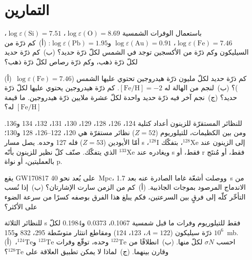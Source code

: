 \section{التمارين}

\begin{exercise}[$\star$]\label{exo:b3:origin-of-elements:1}
باستعمال الوفرات الشمسية $\log\varepsilon(\mathrm{O}) = 8.69$،
$\log\varepsilon(\mathrm{Si}) = 7.51$، $\log\varepsilon(\mathrm{Fe}) =
7.46$، $\log\varepsilon(\mathrm{Au}) = 0.91$
و$\log\varepsilon(\mathrm{Pb}) = 1.95$: (أ)~كم ذرّة من السيليكون
وكم ذرّة من الأكسجين توجد في الشمس لكلّ ذرّة حديد؟ (ب)~كم
ذرّة حديد لكلّ ذرّة ذهب، وكم ذرّة رصاص لكلّ ذرّة ذهب؟
\end{exercise}

\begin{exercise}[$\star$]\label{exo:b3:origin-of-elements:2}
(أ)~كم ذرّة حديد لكلّ مليون ذرّة هيدروجين تحتوي عليها الشمس
($\log\varepsilon(\mathrm{Fe}) = 7.46$)؟ (ب)~لنجم من الهالة له
$[\mathrm{Fe/H}] = -2$. كم ذرّة هيدروجين يحتوي عليها لكلّ
ذرّة حديد؟ (ج)~نجم آخر فيه ذرّة حديد واحدة لكلّ عشرة ملايين
ذرّة هيدروجين. ما قيمة $[\mathrm{Fe/H}]$ له؟
\end{exercise}

\begin{exercise}[$\star$]\label{exo:b3:origin-of-elements:3}
للنظائر المستقرّة للزينون أعداد كتلية 124، 126، 128، 129، 130،
131، 132، 134 و136. ومن بين الكظيمات، للتيلوريوم ($Z = 52$)
نظائر مستقرّة هي 120، 122--126، 128 و130؛ أمّا الأيودين ($Z = 53$) فله 127 وحده.
يصل مسار s إلى الزينون عند $^{128}\mathrm{Xe}$، بتفكّك
$^{128}\mathrm{I}$، ويغادره عند $^{133}\mathrm{Xe}$ الذي يتفكّك.
صنّف كلّ نظير للزينون بأنّه s فقط، أو r فقط، أو مُنتَج بالعمليتين، أو
نواة p.
\end{exercise}

\begin{exercise}[$\star$]\label{exo:b3:origin-of-elements:4}
يقع GW170817 على بُعد نحو \qty{40}{Mpc}، ووصلت أشعّة غاما الصادرة عنه
بعد \qty{1.7}{s} من الاندماج المرصود بموجات الجاذبية. (أ)~كم من الزمن
سارت الإشارتان؟ (ب)~إذا نُسب التأخّر كلّه إلى
فرقٍ بين السرعتين، فكم يبلغ هذا الفرق بوصفه كسرًا
من سرعة الضوء على الأكثر؟
\end{exercise}

\begin{exercise}[$\star\star$]\label{exo:b3:origin-of-elements:5}
للنظائر الثلاثة s فقط للتيلوريوم وفرات ما قبل شمسية
\num{0.1067}، \num{0.0373} و\num{0.1984} لكلّ $10^6$ ذرّة سيليكون
($A = 122$، $123$، $124$) ومقاطع انتثار متوسّطة \num{295}،
\num{832} و\qty{155}{mb}. (أ)~احسب $\sigma N$ لكلّ منها. (ب)~انطلاقًا من
$^{122}\mathrm{Te}$ وحده، توقّع وفرات $^{123}\mathrm{Te}$
و$^{124}\mathrm{Te}$، وقارن بينهما. (ج)~لماذا لا يمكن تطبيق العلاقة
على $^{128}\mathrm{Te}$؟
\end{exercise}

